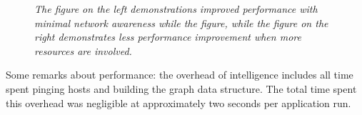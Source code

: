 \documentclass{rspublic}
\begin{document}
\begin{center}
\begin{figure}
\caption{\textit{The figure on the left demonstrations improved
performance with minimal network awareness while the figure, while the
figure on the right demonstrates less performance improvement when more
resources are involved.}}
\label{experiment2}
\end{figure}
\end{center}

Some remarks about performance: the overhead of intelligence includes
all time spent pinging hosts and building the graph data structure.  The
total time spent this overhead was negligible at approximately two
seconds per application run.
\end{document}
